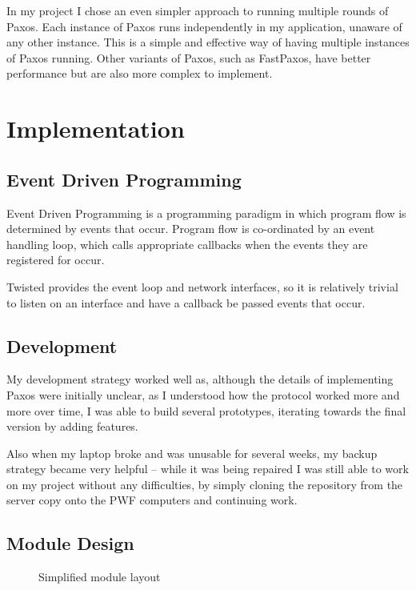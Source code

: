 \documentclass[12pt,twoside,notitlepage]{report}
\newcommand{\lwincludegraphics}[2][]{%
  \sbox{0}{\texttt{[image: \#2]}}%
  \ifdim\wd0>\linewidth
    \resizebox{\linewidth}{!}{\box0 }%
  \else
    \leavevmode\box0
  \fi}
\begin{document}
In my project I chose an even simpler approach to running multiple rounds of Paxos. Each instance
of Paxos runs independently in my application, unaware of any other instance. This is a simple and
effective way of having multiple instances of Paxos running. Other variants of Paxos, such as
FastPaxos, have better performance but are also more complex to implement.


\cleardoublepage
\chapter{Implementation}

\section{Event Driven Programming}

Event Driven Programming is a programming paradigm in which program flow is determined by events
that occur. Program flow is co-ordinated by an event handling loop, which calls appropriate
callbacks when the events they are registered for occur.

Twisted provides the event loop and network interfaces, so it is relatively trivial to listen on
an interface and have a callback be passed events that occur.

\section{Development}

My development strategy worked well as, although the details of implementing Paxos were initially
unclear, as I understood how the protocol worked more and more over time, I was able to build
several prototypes, iterating towards the final version by adding features.

Also when my laptop broke and was unusable for several weeks, my backup strategy became very
helpful -- while it was being repaired I was still able to work on my project without any
difficulties, by simply cloning the repository from the server copy onto the PWF computers and
continuing work.

\section{Module Design}

\begin{figure}[htb]
\centering
\lwincludegraphics[scale=0.5]{figs/module-layout.eps}
\caption{\label{fig:module-layout}Simplified module layout}
\end{figure}
\end{document}
